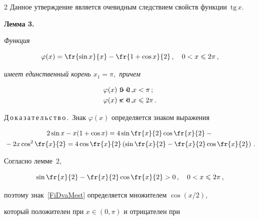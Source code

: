 \begin{multicols}{2}
Данное утверждение является очевидным следствием свойств функции~$\mathrm{tg}\,x$.



\medskip



\noindent

\textbf{Лемма 3.}

\label{FiDva}

\textit{Функция}

$$

\varphi(x)=\fr{\sin x}{x} -\fr{1+\cos x}{2}\,,\quad 0<x\le 2\pi\,,

$$

\textit{имеет единственный корень $x_1=\pi,$ причем}

\begin{align*}

  \varphi(x)&>0\,, &\hspace*{-30pt}0&<x<\pi\,; \\

  \varphi(x)&<0\,, &\hspace*{-30pt} \pi&<x\le2\pi\,.

\end{align*}



\medskip



\noindent

Д\,о\,к\,а\,з\,а\,т\,е\,л\,ь\,с\,т\,в\,о\,.\ Знак $\varphi(x)$ определяется знаком выражения

\begin{multline}

\label{FiDvaMest}

2\sin x-x(1+\cos x)= 4\sin\fr{x}{2} \cos\fr{x}{2}-{}\\

{}-2x\cos^2\fr{x}{2}=

4\cos\fr {x}{2}\left(\sin\fr{x}{2}-\fr{x}{2}\cos\fr{x}{2}\right)\,.

\end{multline}

Согласно лемме~2,

$$

\sin\fr{x}{2}-\fr{x}{2}\cos\fr{x}{2}>0\,,\quad 0<x\le 2\pi\,,

$$

поэтому знак~\eqref{FiDvaMest} определяется множителем $\cos(x/2)$,

который положителен при ${x\in(0,\pi)}$ и отрицателен при


\end{multicols}
